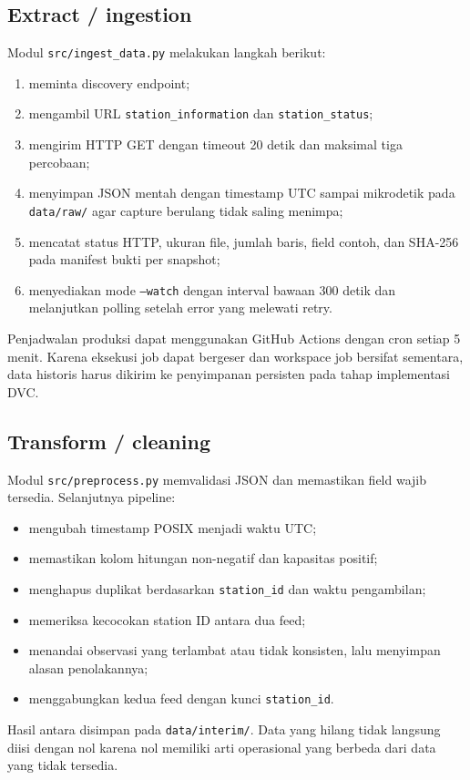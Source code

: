 \documentclass[10pt,a4paper]{article}
\newcommand{\code}[1]{\texttt{#1}}
\begin{document}
\subsection{Extract / ingestion}
Modul \code{src/ingest\_data.py} melakukan langkah berikut:
\begin{enumerate}
  \item meminta discovery endpoint;
  \item mengambil URL \code{station\_information} dan \code{station\_status};
  \item mengirim HTTP GET dengan timeout 20 detik dan maksimal tiga percobaan;
  \item menyimpan JSON mentah dengan timestamp UTC sampai mikrodetik pada \code{data/raw/} agar capture berulang tidak saling menimpa;
  \item mencatat status HTTP, ukuran file, jumlah baris, field contoh, dan SHA-256 pada manifest bukti per snapshot;
  \item menyediakan mode \code{--watch} dengan interval bawaan 300 detik dan melanjutkan polling setelah error yang melewati retry.
\end{enumerate}
Penjadwalan produksi dapat menggunakan GitHub Actions dengan cron setiap 5
menit. Karena eksekusi job dapat bergeser dan workspace job bersifat
sementara, data historis harus dikirim ke penyimpanan persisten pada tahap
implementasi DVC.

\subsection{Transform / cleaning}
Modul \code{src/preprocess.py} memvalidasi JSON dan memastikan field wajib tersedia.
Selanjutnya pipeline:
\begin{itemize}
  \item mengubah timestamp POSIX menjadi waktu UTC;
  \item memastikan kolom hitungan non-negatif dan kapasitas positif;
  \item menghapus duplikat berdasarkan \code{station\_id} dan waktu pengambilan;
  \item memeriksa kecocokan station ID antara dua feed;
  \item menandai observasi yang terlambat atau tidak konsisten, lalu menyimpan alasan penolakannya;
  \item menggabungkan kedua feed dengan kunci \code{station\_id}.
\end{itemize}
Hasil antara disimpan pada \code{data/interim/}. Data yang hilang tidak
langsung diisi dengan nol karena nol memiliki arti operasional yang berbeda
dari data yang tidak tersedia.
\end{document}
